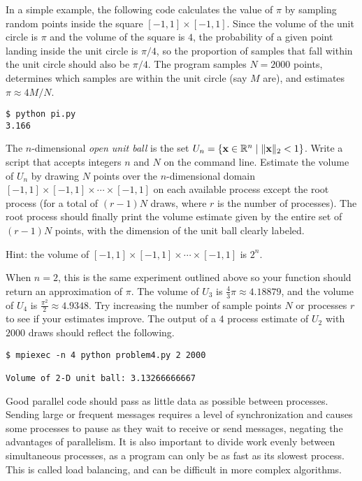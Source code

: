 In a simple example, the following code calculates the value of $\pi$ by sampling random points inside the square $[-1,1]\times[-1,1]$.
Since the volume of the unit circle is $\pi$ and the volume of the square is $4$, the probability of a given point landing inside the unit circle is $\pi/4$, so the proportion of samples that fall within the unit circle should also be $\pi/4$.
The program samples $N = 2000$ points, determines which samples are within the unit circle (say $M$ are), and estimates $\pi\approx 4M/N$.

\begin{lstlisting}
$ python pi.py
3.166
\end{lstlisting}

\begin{problem}
The $n$-dimensional \emph{open unit ball} is the set $U_n = \{\mathbf{x}\in\mathbb{R}^n\mid \|\mathbf{x}\|_2 < 1\}$.
Write a script that accepts integers $n$ and $N$ on the command line.
Estimate the volume of $U_n$ by drawing $N$ points over the $n$-dimensional domain $[-1,1]\times[-1,1]\times\cdots\times[-1,1]$ on each available process except the root process (for a total of $(r-1)N$ draws, where $r$ is the number of processes).
The root process should finally print the volume estimate given by the entire set of $(r-1)N$ points, with the dimension of the unit ball clearly labeled.

\noindent Hint: the volume of $[-1,1]\times[-1,1]\times\cdots\times[-1,1]$ is $2^n$.

When $n=2$, this is the same experiment outlined above so your function should return an approximation of $\pi$.
The volume of $U_3$ is $\frac{4}{3}\pi \approx 4.18879$, and the volume of $U_4$ is $\frac{\pi^2}{2} \approx 4.9348$.
Try increasing the number of sample points $N$ or processes $r$ to see if your estimates improve.
The output of a $4$ process estimate of $U_2$ with $2000$ draws should reflect the following.
\begin{lstlisting}[style=ShellOutput]
$ mpiexec -n 4 python problem4.py 2 2000

Volume of 2-D unit ball: 3.13266666667
\end{lstlisting}
\end{problem}

\begin{info}
Good parallel code should pass as little data as possible between processes.
Sending large or frequent messages requires a level of synchronization and causes some processes to pause as they wait to receive or send messages, negating the advantages of parallelism.
It is also important to divide work evenly between simultaneous processes, as a program can only be as fast as its slowest process.
This is called load balancing, and can be difficult in more complex algorithms.
\end{info}


